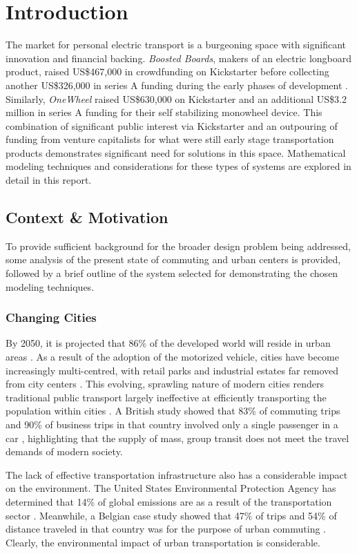 \section{Introduction}
The market for personal electric transport is a burgeoning space with significant innovation and financial backing. 
\textit{Boosted Boards}, makers of an electric longboard product, raised US\$467,000 in crowdfunding on Kickstarter \cite{boostedkickstart} before collecting another US\$326,000 in series A funding during the early phases of development \cite{boostedfunding}. 
Similarly, \textit{OneWheel} raised US\$630,000 on Kickstarter \cite{onewheelkickstart} and an additional US\$3.2 million in series A funding \cite{onewheelfunding} for their self stabilizing monowheel device. 
This combination of significant public interest via Kickstarter and an outpouring of funding from venture capitalists for what were still early stage transportation products demonstrates significant need for solutions in this space.
Mathematical modeling techniques and considerations for these types of systems are explored in detail in this report.
\subsection{Context \& Motivation}
To provide sufficient background for the broader design problem being addressed, some analysis of the present state of commuting and urban centers is provided, followed by a brief outline of the system selected for demonstrating the chosen modeling techniques.
\subsubsection{Changing Cities}
By 2050, it is projected that 86\% of the developed world will reside in urban areas \cite{Economist}. 
As a result of the adoption of the motorized vehicle, cities have become increasingly multi-centred, with retail parks and industrial estates far removed from city centers \cite{SustainableTransport}. 
This evolving, sprawling nature of modern cities renders traditional public transport largely ineffective at efficiently transporting the population within cities \cite{SustainableTransport}. 
A British study showed that 83\% of commuting trips and 90\% of business trips in that country involved only a single passenger in a car \cite{NTS}, highlighting that the supply of mass, group transit does not meet the travel demands of modern society.

The lack of effective transportation infrastructure also has a considerable impact on the environment. 
The United States Environmental Protection Agency has determined that 14\% of global emissions are as a result of the transportation sector \cite{EPA}. 
Meanwhile, a Belgian case study showed that 47\% of trips and 54\% of distance traveled in that country was for the purpose of urban commuting \cite{Belgium}. 
Clearly, the environmental impact of urban transportation is considerable.

